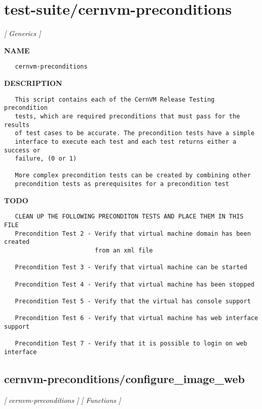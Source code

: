\newpage
\section{test-suite/cernvm-preconditions}
\textsl{[ Generics ]}

\label{ch:robo32}
\label{ch:test_suite_cernvm_preconditions}
\textbf{NAME}
\begin{verbatim}
   cernvm-preconditions
\end{verbatim}
\textbf{DESCRIPTION}
\begin{verbatim}
   This script contains each of the CernVM Release Testing precondition
   tests, which are required preconditions that must pass for the results 
   of test cases to be accurate. The precondition tests have a simple
   interface to execute each test and each test returns either a success or 
   failure, (0 or 1)

   More complex precondition tests can be created by combining other 
   precondition tests as prerequisites for a precondition test
\end{verbatim}
\textbf{TODO}
\begin{verbatim}
   CLEAN UP THE FOLLOWING PRECONDITON TESTS AND PLACE THEM IN THIS FILE
   Precondition Test 2 - Verify that virtual machine domain has been created 
                         from an xml file

   Precondition Test 3 - Verify that virtual machine can be started

   Precondition Test 4 - Verify that virtual machine has been stopped

   Precondition Test 5 - Verify that the virtual has console support

   Precondition Test 6 - Verify that virtual machine has web interface support

   Precondition Test 7 - Verify that it is possible to login on web interface
\end{verbatim}
\newpage
\subsection{cernvm-preconditions/configure\_image\_web}
\textsl{[ cernvm-preconditions ]}
\textsl{[ Functions ]}

